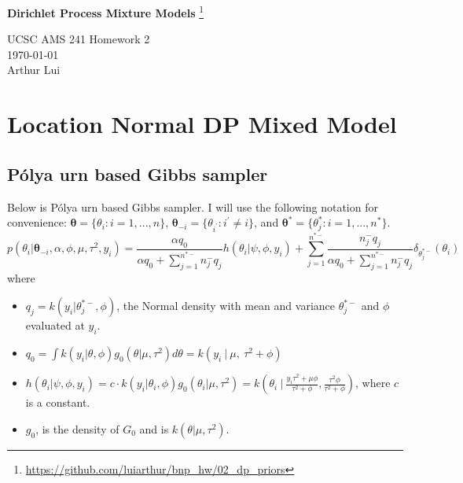 \documentclass{article}
\def\wl{\par \vspace{\baselineskip}\noindent}
\def\ds{\displaystyle}
\def\tu{\textunderscore}
\def\hline{ \textcolor{lgrey}{\hrulefill} }
\newcommand{\m}[1]{\mathbf{\bm{#1}}} %
\def \ip{{i^\prime}}
\def \tmi{ \{ \theta_\ip : \ip \neq i\} }
\def \stmi{ \m{\theta}_{-i} }
\def \tv{ \{ \theta_i : i = 1,...,n\} }
\def \stv{ \m{\theta} }
\def \tu{ \{ \theta_j^* : i = 1,...,n^*\} }
\def \stu{ \m{\theta^*} }
\begin{document}
\begin{center}
  {\huge \textbf{Dirichlet Process Mixture Models}
    \footnote{\url{https://github.com/luiarthur/bnp_hw/02_dp_priors}}
  }\\
  \wl
  UCSC AMS 241 Homework 2\\
  \noindent\today\\
  Arthur Lui\\
  \hline
\end{center}

\section{Location Normal DP Mixed Model}

\subsection{P\'olya urn based Gibbs sampler}
\def\denom{ \alpha q_0 + \sum_{j=1}^{n^{*-}}n_j^- q_j }
Below is P\'olya urn based Gibbs sampler.
I will use the following notation for convenience: $\stv = \tv$, $\stmi = \tmi$, and $\stu = \tu$.
\[
    p(\theta_i | \stmi, \alpha, \phi, \mu, \tau^2, y_i) = 
    \ds\frac{\alpha q_0}{\denom} h(\theta_i| \psi, \phi, y_i) + 
    \ds\sum_{j=1}^{n^{*-}}\frac{ n_j^- q_j }{\denom} \delta_{\theta_j^{*-}}(\theta_i)
\]
where 
\begin{itemize}
  \item $q_j = k(y_i | \theta_j^{*-},\phi)$, the Normal density with mean and variance $\theta_j^{*-}$ and $\phi$ 
    evaluated at $y_i$.
  \item $q_0 = \ds\int k(y_i | \theta, \phi) g_0(\theta | \mu, \tau^2) d\theta
    = k(y_i~|~\mu,~\tau^2 + \phi)$
  \item $h(\theta_i| \psi, \phi, y_i) = c \cdot k(y_i | \theta_i, \phi) g_0(\theta_i | \mu, \tau^2)
    = k\left(\theta_i~\biggr|~\ds \frac{y_i\tau^2 + \mu\phi}{\tau^2+\phi},
    \ds\frac{\tau^2\phi}{\tau^2 + \phi} \right)$, where $c$ is a constant.
  \item $g_0$, is the density of $G_0$ and is $k(\theta | \mu, \tau^2)$.
\end{itemize}
\end{document}
